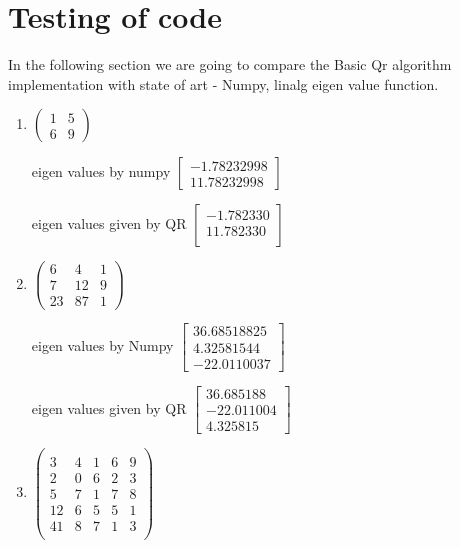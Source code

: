 \documentclass[pdflatex,sn-mathphys-num]{sn-jnl}
\begin{document}
\section{Testing of code}
In the following section we are going to compare the Basic Qr algorithm implementation with state of art - Numpy, linalg eigen value function. 
\iffalse
\begin{enumerate}
    \item $\begin{pmatrix}  
1 & 5 \\
6 & 9 
\end{pmatrix}$

eigen values by numpy  $\begin{bmatrix}
-1.78232998 \\ 11.78232998
\end{bmatrix}$

eigen values given by QR $\begin{bmatrix} -1.782330\\11.782330 \\\end{bmatrix}$

\item $\begin{pmatrix}  
6 & 4 & 1\\
7 & 12 & 9\\
23 & 87 & 1
\end{pmatrix}$

eigen values by Numpy $ \begin{bmatrix}
 36.68518825 \\  4.32581544 \\-22.0110037  
\end{bmatrix}$

eigen values given by QR $\begin{bmatrix} 36.685188\\-22.011004\\4.325815\end{bmatrix}$


\item $\begin{pmatrix}   \\
3 & 4 & 1& 6 & 9\\
2&0 & 6&2 & 3\\
5 & 7 & 1&7&8\\
12 &6 &5&5&1\\
41&8&7&1 &3\\

\end{pmatrix}$


\end{enumerate}
\end{document}
